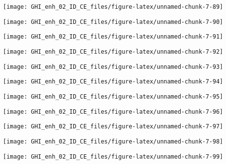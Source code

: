 \documentclass[
  10pt,
  a4paper,oneside]{article}
\begin{document}
\begin{center}\texttt{[image: GHI\_enh\_02\_ID\_CE\_files/figure-latex/unnamed-chunk-7-89]} \end{center}

\begin{center}\texttt{[image: GHI\_enh\_02\_ID\_CE\_files/figure-latex/unnamed-chunk-7-90]} \end{center}

\begin{center}\texttt{[image: GHI\_enh\_02\_ID\_CE\_files/figure-latex/unnamed-chunk-7-91]} \end{center}

\begin{center}\texttt{[image: GHI\_enh\_02\_ID\_CE\_files/figure-latex/unnamed-chunk-7-92]} \end{center}

\begin{center}\texttt{[image: GHI\_enh\_02\_ID\_CE\_files/figure-latex/unnamed-chunk-7-93]} \end{center}

\begin{center}\texttt{[image: GHI\_enh\_02\_ID\_CE\_files/figure-latex/unnamed-chunk-7-94]} \end{center}

\begin{center}\texttt{[image: GHI\_enh\_02\_ID\_CE\_files/figure-latex/unnamed-chunk-7-95]} \end{center}

\begin{center}\texttt{[image: GHI\_enh\_02\_ID\_CE\_files/figure-latex/unnamed-chunk-7-96]} \end{center}

\begin{center}\texttt{[image: GHI\_enh\_02\_ID\_CE\_files/figure-latex/unnamed-chunk-7-97]} \end{center}

\begin{center}\texttt{[image: GHI\_enh\_02\_ID\_CE\_files/figure-latex/unnamed-chunk-7-98]} \end{center}

\begin{center}\texttt{[image: GHI\_enh\_02\_ID\_CE\_files/figure-latex/unnamed-chunk-7-99]} \end{center}
\end{document}
